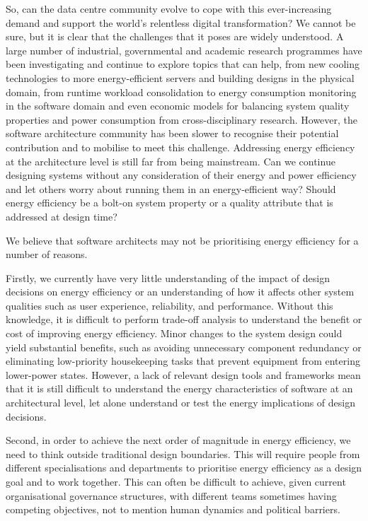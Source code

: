 So, can the data centre community evolve to cope with this ever-increasing demand and support the world's relentless digital transformation? We cannot be sure, but it is clear that the challenges that it poses are widely understood.  A large number of industrial, governmental and academic research programmes \cite{loken2010-scinet, bahsoon2010-cloudpower, greengrid2011-dcefficiency, dc4cities2014_dcmetrics,ida2015-gdcip} have been investigating and continue to explore topics that can help, from new cooling technologies to more energy-efficient servers and building designs in the physical domain, from runtime workload consolidation to energy consumption monitoring in the software domain and even economic models for balancing system quality properties and power consumption from cross-disciplinary research. However, the software architecture community has been slower to recognise their potential contribution and to mobilise to meet this challenge. Addressing energy efficiency at the architecture level is still far from being mainstream. Can we continue designing systems without any consideration of their energy and power efficiency and let others worry about running them in an energy-efficient way? Should energy efficiency be a bolt-on system property or a quality attribute that is addressed at design time?

We believe that software architects may not be prioritising energy efficiency for a number of reasons.

Firstly, we currently have very little understanding of the impact of design decisions on energy efficiency or an understanding of how it affects other system qualities such as user experience, reliability, and performance.  Without this knowledge, it is difficult to perform trade-off analysis to understand the benefit or cost of improving energy efficiency. Minor changes to the system design could yield substantial benefits, such as avoiding unnecessary component redundancy or eliminating low-priority housekeeping tasks that prevent equipment from entering lower-power states. However, a lack of relevant design tools and frameworks mean that it is still difficult to understand the energy characteristics of software at an architectural level, let alone understand or test the energy implications of design decisions. 

Second, in order to achieve the next order of magnitude in energy efficiency, we need to think outside traditional design boundaries. This will require people from different specialisations and departments to prioritise energy efficiency as a design goal and to work together. This can often be difficult to achieve, given current organisational governance structures, with different teams sometimes having competing objectives, not to mention human dynamics and political barriers.

